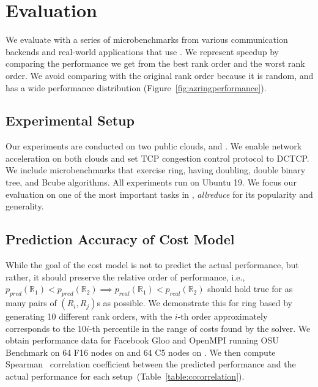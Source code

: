 \section{Evaluation}
We evaluate \cmpi with a series of microbenchmarks from various communication backends and real-world applications that use \collectives. We represent speedup by comparing the performance we get from the best rank order and the worst rank order. We avoid comparing with the original rank order because it is random, and has a wide performance distribution (Figure~\ref{fig:azringperformance}).

\subsection{Experimental Setup}
Our experiments are conducted on two public clouds, \azure and \ectwo. We enable network acceleration on both clouds and set TCP congestion control protocol to DCTCP. We include microbenchmarks that exercise ring, having doubling, double binary tree, and Bcube algorithms.  All experiments run on Ubuntu 19. We focus our evaluation on one of the most important tasks in \mpi, \textit{allreduce} for its popularity and generality. %

\subsection{Prediction Accuracy of Cost Model}
While the goal of the cost model is not to predict the actual performance, but rather, it should preserve the relative order of performance, i.e., $p_{pred}(\mathbb{R}_1) < p_{pred}(\mathbb{R}_2) \implies p_{real}(\mathbb{R}_1) < p_{real}(\mathbb{R}_2)$ should hold true for as many pairs of $(R_i, R_j)$s as possible. We demonstrate this for ring based \mpi by generating 10 different rank orders, with the $i$-th order approximately corresponds to the $10i$-th percentile in the range of costs found by the solver. We obtain performance data for Facebook Gloo and OpenMPI running OSU Benchmark on 64 F16 nodes on \azure and 64 C5 nodes on \ectwo. We then compute Spearman~\cite{spearman} correlation coefficient between the predicted performance and the actual performance for each setup~(Table~\ref{table:cccorrelation}). 

